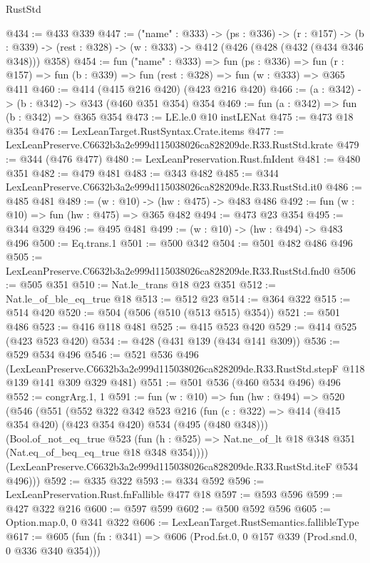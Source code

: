 \begin{lexlean}{RustStd}
\begin{coremodule}
@434 := @433 @339
@447 := ("name" : @333) ->
  (ps : @336) ->
  (r : @157) ->
  (b : @339) -> (rest : @328) -> (w : @333) -> @412 (@426 (@428 (@432 (@434 @346 @348))) @358)
@454 := fun ("name" : @333) =>
  fun (ps : @336) =>
  fun (r : @157) => fun (b : @339) => fun (rest : @328) => fun (w : @333) => @365 @411
@460 := @414 (@415 @216 @420) (@423 @216 @420)
@466 := (a : @342) -> (b : @342) -> @343 (@460 @351 @354) @354
@469 := fun (a : @342) => fun (b : @342) => @365 @354
@473 := LE.le.{0} @10 instLENat
@475 := @473 @18 @354
@476 := LexLeanTarget.RustSyntax.Crate.items
@477 := LexLeanPreserve.C6632b3a2e999d115038026ca828209de.R33.RustStd.krate
@479 := @344 (@476 @477)
@480 := LexLeanPreservation.Rust.fnIdent
@481 := @480 @351
@482 := @479 @481
@483 := @343 @482
@485 := @344 LexLeanPreserve.C6632b3a2e999d115038026ca828209de.R33.RustStd.it0
@486 := @485 @481
@489 := (w : @10) -> (hw : @475) -> @483 @486
@492 := fun (w : @10) => fun (hw : @475) => @365 @482
@494 := @473 @23 @354
@495 := @344 @329
@496 := @495 @481
@499 := (w : @10) -> (hw : @494) -> @483 @496
@500 := Eq.trans.{1}
@501 := @500 @342
@504 := @501 @482 @486 @496
@505 := LexLeanPreserve.C6632b3a2e999d115038026ca828209de.R33.RustStd.fnd0
@506 := @505 @351
@510 := Nat.le_trans @18 @23 @351
@512 := Nat.le_of_ble_eq_true @18
@513 := @512 @23
@514 := @364 @322
@515 := @514 @420
@520 := @504 (@506 (@510 (@513 @515) @354))
@521 := @501 @486
@523 := @416 @118 @481
@525 := @415 @523 @420
@529 := @414 @525 (@423 @523 @420)
@534 := @428 (@431 @139 (@434 @141 @309))
@536 := @529 @534 @496
@546 := @521
    @536
    @496
    (LexLeanPreserve.C6632b3a2e999d115038026ca828209de.R33.RustStd.stepF
      @118
      @139
      @141
      @309
      @329
      @481)
@551 := @501 @536 (@460 @534 @496) @496
@552 := congrArg.{1, 1}
@591 := fun (w : @10) =>
  fun (hw : @494) =>
  @520
    (@546
      (@551
        (@552
          @322
          @342
          @523
          @216
          (fun (c : @322) => @414 (@415 @354 @420) (@423 @354 @420) @534 (@495 (@480 @348)))
          (Bool.of_not_eq_true
            @523
            (fun (h : @525) => Nat.ne_of_lt @18 @348 @351 (Nat.eq_of_beq_eq_true @18 @348 @354))))
        (LexLeanPreserve.C6632b3a2e999d115038026ca828209de.R33.RustStd.iteF @534 @496)))
@592 := @335 @322
@593 := @334 @592
@596 := LexLeanPreservation.Rust.fnFallible @477 @18
@597 := @593 @596
@599 := @427 @322 @216
@600 := @597 @599
@602 := @500 @592 @596
@605 := Option.map.{0, 0} @341 @322
@606 := LexLeanTarget.RustSemantics.fallibleType
@617 := @605 (fun (fn : @341) => @606 (Prod.fst.{0, 0} @157 @339 (Prod.snd.{0, 0} @336 @340 @354)))

\end{coremodule}
\end{lexlean}
